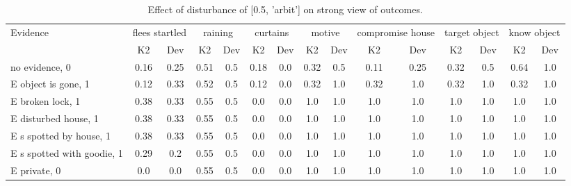 \begin{table}\begin{tabular}{l|cc|cc|cc|cc|cc|cc|cc}\toprule\multirow{2}{*}{Evidence} & \multicolumn{2}{c}{flees startled}& \multicolumn{2}{c}{raining}& \multicolumn{2}{c}{curtains}& \multicolumn{2}{c}{motive}& \multicolumn{2}{c}{compromise house}& \multicolumn{2}{c}{target object}& \multicolumn{2}{c}{know object}\\& {K2} & {Dev}& {K2} & {Dev}& {K2} & {Dev}& {K2} & {Dev}& {K2} & {Dev}& {K2} & {Dev}& {K2} & {Dev}\\\midrule
no evidence, 0 & \cellcolor{Bittersweet}0.16&\cellcolor{Bittersweet}0.25&0.51&0.5&\cellcolor{Bittersweet}0.18&\cellcolor{Bittersweet}0.0&\cellcolor{Bittersweet}0.32&\cellcolor{Bittersweet}0.5&\cellcolor{Bittersweet}0.11&\cellcolor{Bittersweet}0.25&\cellcolor{Bittersweet}0.32&\cellcolor{Bittersweet}0.5&\cellcolor{Bittersweet}0.64&\cellcolor{Bittersweet}1.0\\E object is gone, 1 & \cellcolor{Bittersweet}0.12&\cellcolor{Bittersweet}0.33&0.52&0.5&\cellcolor{Bittersweet}0.12&\cellcolor{Bittersweet}0.0&\cellcolor{Bittersweet}0.32&\cellcolor{Bittersweet}1.0&\cellcolor{Bittersweet}0.32&\cellcolor{Bittersweet}1.0&\cellcolor{Bittersweet}0.32&\cellcolor{Bittersweet}1.0&\cellcolor{Bittersweet}0.32&\cellcolor{Bittersweet}1.0\\E broken lock, 1 & 0.38&0.33&\cellcolor{Bittersweet}0.55&\cellcolor{Bittersweet}0.5&0.0&0.0&1.0&1.0&1.0&1.0&1.0&1.0&1.0&1.0\\E disturbed house, 1 & 0.38&0.33&\cellcolor{Bittersweet}0.55&\cellcolor{Bittersweet}0.5&0.0&0.0&1.0&1.0&1.0&1.0&1.0&1.0&1.0&1.0\\E s spotted by house, 1 & 0.38&0.33&\cellcolor{Bittersweet}0.55&\cellcolor{Bittersweet}0.5&0.0&0.0&1.0&1.0&1.0&1.0&1.0&1.0&1.0&1.0\\E s spotted with goodie, 1 & \cellcolor{Bittersweet}0.29&\cellcolor{Bittersweet}0.2&\cellcolor{Bittersweet}0.55&\cellcolor{Bittersweet}0.5&0.0&0.0&1.0&1.0&1.0&1.0&1.0&1.0&1.0&1.0\\E private, 0 & 0.0&0.0&\cellcolor{Bittersweet}0.55&\cellcolor{Bittersweet}0.5&0.0&0.0&1.0&1.0&1.0&1.0&1.0&1.0&1.0&1.0\\\bottomrule\end{tabular}\caption{Effect of disturbance of [0.5, 'arbit'] on strong view of outcomes.}\end{table}